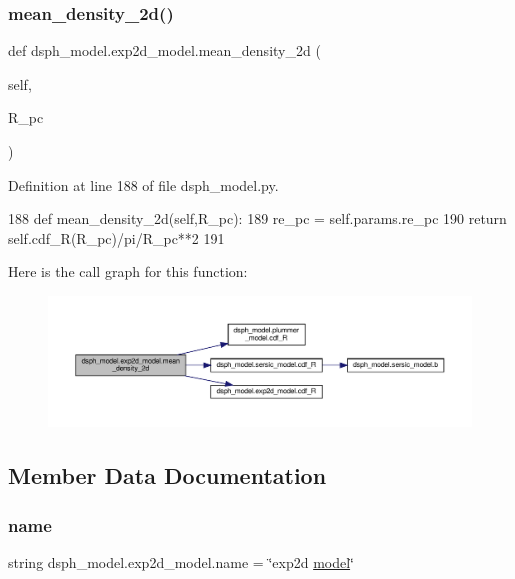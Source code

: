 \subsubsection{\texorpdfstring{mean\+\_\+density\+\_\+2d()}{mean\_density\_2d()}}
{\footnotesize\ttfamily def dsph\+\_\+model.\+exp2d\+\_\+model.\+mean\+\_\+density\+\_\+2d (\begin{DoxyParamCaption}\item[{}]{self,  }\item[{}]{R\+\_\+pc }\end{DoxyParamCaption})}



Definition at line 188 of file dsph\+\_\+model.\+py.


\begin{DoxyCode}
188     \textcolor{keyword}{def }mean\_density\_2d(self,R\_pc):
189         re\_pc = self.params.re\_pc
190         \textcolor{keywordflow}{return} self.cdf\_R(R\_pc)/pi/R\_pc**2
191     
\end{DoxyCode}
Here is the call graph for this function\+:\nopagebreak
\begin{figure}[H]
\begin{center}
\leavevmode
\includegraphics[width=350pt]{df/d3d/classdsph__model_1_1exp2d__model_af2224092e988940539b872a4fe0afa38_cgraph}
\end{center}
\end{figure}


\subsection{Member Data Documentation}
\mbox{\label{classdsph__model_1_1exp2d__model_a172eee0bbbeb483d5253ec3b426e92e7}} 
\subsubsection{\texorpdfstring{name}{name}}
{\footnotesize\ttfamily string dsph\+\_\+model.\+exp2d\+\_\+model.\+name = \char`\"{}exp2d \hyperlink{classdsph__model_1_1model}{model}\char`\"{}\hspace{0.3cm}{\ttfamily [static]}}



